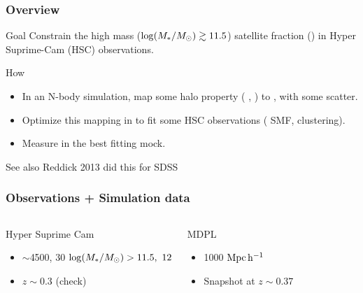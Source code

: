 \documentclass[t]{beamer}
\begin{document}
\begin{frame}
    \frametitle{Overview}
    \begin{block}{Goal}
        Constrain the high mass (${\rm log}{}(M_{\ast}{} / \mbox{$M_{\odot}$}{}){} \gtrsim{} 11.5$) satellite fraction (\fsat{}) in Hyper Suprime-Cam (HSC) observations.
    \end{block}

    \begin{block}{How}
        \begin{itemize}
            \item In an N-body simulation, map some halo property (\eg{} \MhaloPeak{}, \vmp{}) to \Mstar{}, with some scatter.
            \item Optimize this mapping in to fit some HSC observations (\eg{} SMF, clustering).
            \item Measure \fsat{} in the best fitting mock.
        \end{itemize}
    \end{block}

    \begin{block}{See also}
        Reddick 2013 did this for SDSS
    \end{block}
\end{frame}

\begin{frame}
    \frametitle{Observations + Simulation data}

    \begin{columns}

    \begin{block}{Hyper Suprime Cam}
        \begin{itemize}
            \item $\sim{}$4500, 30 ${\rm log}{}(M_{\ast}{} / \mbox{$M_{\odot}$}{}) > 11.5,\ 12$
            \item $z \sim{} 0.3$ (check)
        \end{itemize}
    \end{block}

    \begin{block}{MDPL}
        \begin{itemize}
            \item 1000 ${\rm Mpc}{}\, {\rm h^{-1}}{}$
            \item Snapshot at $z \sim{} 0.37$
        \end{itemize}
    \end{block}

    \end{columns}

\end{frame}
\end{document}
